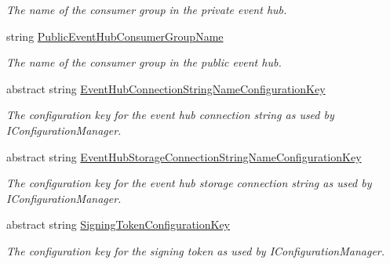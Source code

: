 \begin{DoxyCompactItemize}
\begin{DoxyCompactList}\small\item\em The name of the consumer group in the private event hub. \end{DoxyCompactList}\item 
string \hyperlink{classCqrs_1_1Azure_1_1ServiceBus_1_1AzureEventHub_a505c495eb73e4f888431d408e0b0d8ab_a505c495eb73e4f888431d408e0b0d8ab}{Public\+Event\+Hub\+Consumer\+Group\+Name}
\begin{DoxyCompactList}\small\item\em The name of the consumer group in the public event hub. \end{DoxyCompactList}\item 
abstract string \hyperlink{classCqrs_1_1Azure_1_1ServiceBus_1_1AzureEventHub_ad77526406b246313591e11b90e1a67d5_ad77526406b246313591e11b90e1a67d5}{Event\+Hub\+Connection\+String\+Name\+Configuration\+Key}
\begin{DoxyCompactList}\small\item\em The configuration key for the event hub connection string as used by I\+Configuration\+Manager. \end{DoxyCompactList}\item 
abstract string \hyperlink{classCqrs_1_1Azure_1_1ServiceBus_1_1AzureEventHub_ad400a17bf61c218e6330cd6500458801_ad400a17bf61c218e6330cd6500458801}{Event\+Hub\+Storage\+Connection\+String\+Name\+Configuration\+Key}
\begin{DoxyCompactList}\small\item\em The configuration key for the event hub storage connection string as used by I\+Configuration\+Manager. \end{DoxyCompactList}\item 
abstract string \hyperlink{classCqrs_1_1Azure_1_1ServiceBus_1_1AzureEventHub_a7dcae4b6bcae81e87b935892e6687382_a7dcae4b6bcae81e87b935892e6687382}{Signing\+Token\+Configuration\+Key}
\begin{DoxyCompactList}\small\item\em The configuration key for the signing token as used by I\+Configuration\+Manager. \end{DoxyCompactList}\item 

\end{DoxyCompactItemize}
